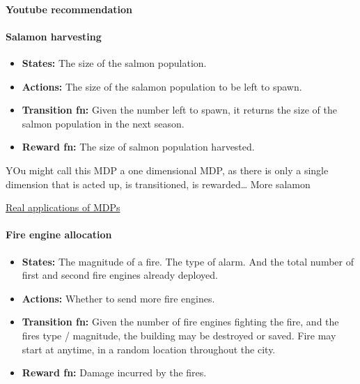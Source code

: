 \hypertarget{youtube-recommendation}{%
\paragraph{Youtube recommendation}\label{youtube-recommendation}}

\hypertarget{salamon-harvesting}{%
\paragraph{Salamon harvesting}\label{salamon-harvesting}}

\begin{itemize}
\tightlist
\item
  \textbf{States:} The size of the salmon population.
\item
  \textbf{Actions:} The size of the salamon population to be left to
  spawn.
\item
  \textbf{Transition fn:} Given the number left to spawn, it returns the
  size of the salmon population in the next season.
\item
  \textbf{Reward fn:} The size of salmon population harvested.
\end{itemize}

YOu might call this MDP a one dimensional MDP, as there is only a single
dimension that is acted up, is transitioned, is rewarded\ldots{} More
salamon

\href{http://www.it.uu.se/edu/course/homepage/aism/st11/MDPApplications1.pdf}{Real
applications of MDPs}

\hypertarget{fire-engine-allocation}{%
\paragraph{Fire engine allocation}\label{fire-engine-allocation}}

\begin{itemize}
\tightlist
\item
  \textbf{States:} The magnitude of a fire. The type of alarm. And the
  total number of first and second fire engines already deployed.
\item
  \textbf{Actions:} Whether to send more fire engines.
\item
  \textbf{Transition fn:} Given the number of fire engines fighting the
  fire, and the fires type / magnitude, the building may be destroyed or
  saved. Fire may start at anytime, in a random location throughout the
  city.
\item
  \textbf{Reward fn:} Damage incurred by the fires.
\end{itemize}

